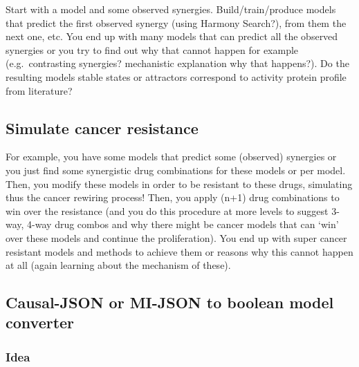 \documentclass[
  12pt,
]{book}
\begin{document}
Start with a model and some observed synergies.
Build/train/produce models that predict the first observed synergy (using Harmony Search?), from them the next one, etc.
You end up with many models that can predict all the observed synergies or you try to find out why that cannot happen for example (e.g.~contrasting synergies? mechanistic explanation why that happens?).
Do the resulting models stable states or attractors correspond to activity protein profile from literature?

\hypertarget{simulate-cancer-resistance}{%
\subsection*{Simulate cancer resistance}\label{simulate-cancer-resistance}}

For example, you have some models that predict some (observed) synergies or you just find some synergistic drug combinations for these models or per model.
Then, you modify these models in order to be resistant to these drugs, simulating thus the cancer rewiring process!
Then, you apply (n+1) drug combinations to win over the resistance (and you do this procedure at more levels to suggest
3-way, 4-way drug combos and why there might be cancer models that can `win' over these models and continue the proliferation).
You end up with super cancer resistant models and methods to achieve them or reasons why this cannot happen at all (again learning about the mechanism of these).

\hypertarget{causal-json-or-mi-json-to-boolean-model-converter}{%
\subsection*{Causal-JSON or MI-JSON to boolean model converter}\label{causal-json-or-mi-json-to-boolean-model-converter}}

\hypertarget{idea}{%
\subsubsection*{Idea}\label{idea}}
\end{document}
